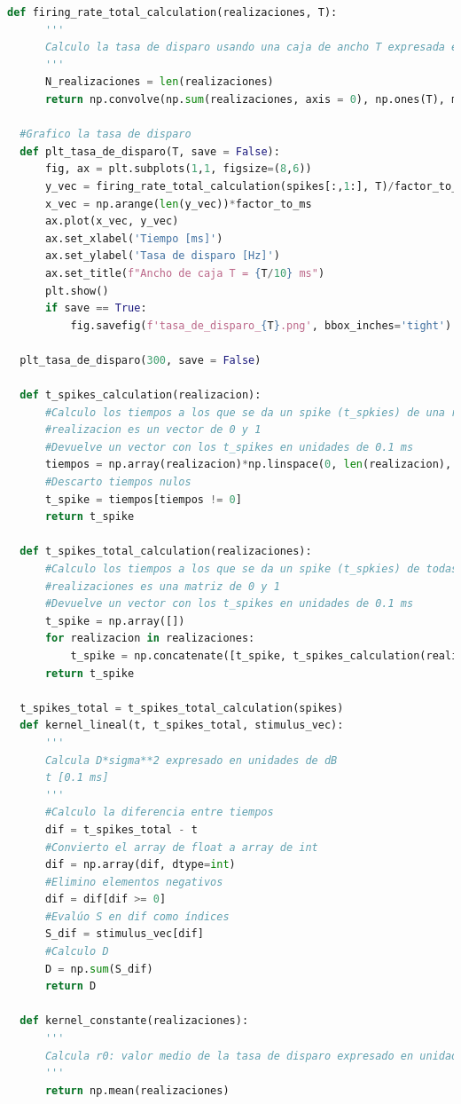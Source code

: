 \documentclass[aps,prb,twocolumn,superscriptaddress,floatfix,longbibliography]{revtex4-2}
\begin{document}
\begin{lstlisting}[language=Python]
  def firing_rate_total_calculation(realizaciones, T):
      '''
      Calculo la tasa de disparo usando una caja de ancho T expresada en unidades de 0.1 ms, es decir, como índice. Tiene que ser múltiplo de 2
      '''
      N_realizaciones = len(realizaciones)
      return np.convolve(np.sum(realizaciones, axis = 0), np.ones(T), mode = "same")/T/N_realizaciones
  
  #Grafico la tasa de disparo
  def plt_tasa_de_disparo(T, save = False):
      fig, ax = plt.subplots(1,1, figsize=(8,6))
      y_vec = firing_rate_total_calculation(spikes[:,1:], T)/factor_to_ms*1e3
      x_vec = np.arange(len(y_vec))*factor_to_ms
      ax.plot(x_vec, y_vec)
      ax.set_xlabel('Tiempo [ms]')
      ax.set_ylabel('Tasa de disparo [Hz]')
      ax.set_title(f"Ancho de caja T = {T/10} ms")
      plt.show()
      if save == True:
          fig.savefig(f'tasa_de_disparo_{T}.png', bbox_inches='tight')
  
  plt_tasa_de_disparo(300, save = False)
  
  def t_spikes_calculation(realizacion):
      #Calculo los tiempos a los que se da un spike (t_spkies) de una realización
      #realizacion es un vector de 0 y 1
      #Devuelve un vector con los t_spikes en unidades de 0.1 ms
      tiempos = np.array(realizacion)*np.linspace(0, len(realizacion), len(realizacion))
      #Descarto tiempos nulos
      t_spike = tiempos[tiempos != 0]
      return t_spike
  
  def t_spikes_total_calculation(realizaciones):
      #Calculo los tiempos a los que se da un spike (t_spkies) de todas las realizaciones
      #realizaciones es una matriz de 0 y 1
      #Devuelve un vector con los t_spikes en unidades de 0.1 ms
      t_spike = np.array([])
      for realizacion in realizaciones:
          t_spike = np.concatenate([t_spike, t_spikes_calculation(realizacion)])
      return t_spike
  
  t_spikes_total = t_spikes_total_calculation(spikes)
  def kernel_lineal(t, t_spikes_total, stimulus_vec):
      '''
      Calcula D*sigma**2 expresado en unidades de dB
      t [0.1 ms]
      '''
      #Calculo la diferencia entre tiempos
      dif = t_spikes_total - t
      #Convierto el array de float a array de int
      dif = np.array(dif, dtype=int)
      #Elimino elementos negativos
      dif = dif[dif >= 0]
      #Evalúo S en dif como índices
      S_dif = stimulus_vec[dif]
      #Calculo D
      D = np.sum(S_dif)
      return D
  
  def kernel_constante(realizaciones):
      '''
      Calcula r0: valor medio de la tasa de disparo expresado en unidades de 1/0.1 ms
      '''
      return np.mean(realizaciones)
  

\end{lstlisting}
\end{document}
